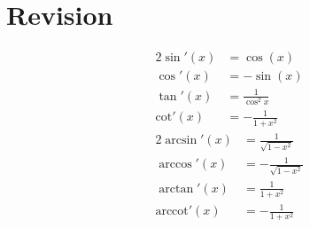 \chapter{Revision}

        \begin{alignat*}{2}
            \sin'(x) &= \cos(x) \\
            \cos'(x) &= -\sin(x) \\
            \tan'(x) &= \frac{1}{\cos^{2}x} \\
            \mbox{cot}'(x) &= - \frac{1}{1 + x^{2}}
        \end{alignat*}
        \begin{alignat*}{2}
            \arcsin'(x) &= \frac{1}{\sqrt{1 - x^{2}}} \\
            \arccos'(x) &= - \frac{1}{\sqrt{1 - x^{2}}} \\
            \arctan'(x) &= \frac{1}{1 + x^{2}} \\
            \mbox{arccot}'(x) &= - \frac{1}{1 + x^{2}}
        \end{alignat*}
